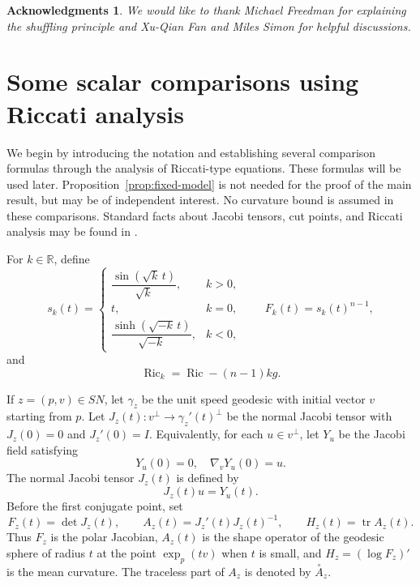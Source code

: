 \documentclass[11pt, reqno]{amsart}
\newtheorem*{ack}{Acknowledgments}
\begin{document}
\begin{ack}
We would like to thank Michael Freedman for explaining the shuffling principle and Xu-Qian Fan and Miles Simon for helpful discussions.
\end{ack}

\section{ Some scalar comparisons using Riccati analysis}\label{sec:some scalar}

We begin by introducing the notation and establishing several comparison formulas through the analysis of Riccati-type equations. These formulas will be used later. Proposition~\ref{prop:fixed-model} is not needed for the proof of the main result, but may be of independent interest. No curvature bound is assumed in these comparisons. Standard facts about Jacobi tensors, cut points, and Riccati analysis may be found in \cite{BishopCrittenden, Petersen}.

For $k\in\mathbb R$, define
\begin{equation*}\label{not:sk}
s_k(t)=
\begin{cases}
\dfrac{\sin(\sqrt{k}\, t)}{\sqrt{k}}, & k>0, \\
t, & k=0, \\
\dfrac{\sinh(\sqrt{-k}\, t)}{\sqrt{-k}}, & k<0,
\end{cases}
\qquad
F_k(t)=s_k(t)^{n-1},
\end{equation*}
and
$$\operatorname{Ric}_k=\operatorname{Ric}-(n-1)kg. $$

If $z=(p, v)\in SN$, let $\gamma_z$ be the unit speed geodesic with initial vector $v$ starting from $p$. Let $J_z(t):v^\perp\to \gamma_z'(t)^\perp$ be the normal Jacobi tensor with $J_z(0)=0$ and $J_z'(0)=I$. Equivalently, for each $u \in v^{\perp}$, let $Y_u$ be the Jacobi field satisfying
$$
Y_u(0)=0, \quad \nabla_{v} Y_u(0)=u.
$$
The normal Jacobi tensor $J_z(t)$ is defined by
$$ J_z(t) u=Y_u(t). $$
Before the first conjugate point, set
$$
F_z(t)=\det J_z(t),
\qquad
A_z(t)=J_z'(t)J_z(t)^{-1},
\qquad
H_z(t)=\operatorname{tr}A_z(t).
$$
Thus $F_z$ is the polar Jacobian, $A_z(t)$ is the shape operator of the geodesic sphere of radius $t$ at the point $\exp_p(tv)$ when $t$ is small, and $H_z=(\log F_z)'$ is the mean curvature. The traceless part of $A_z$ is denoted by $\stackrel{\circ}{A}_z$.
\end{document}
